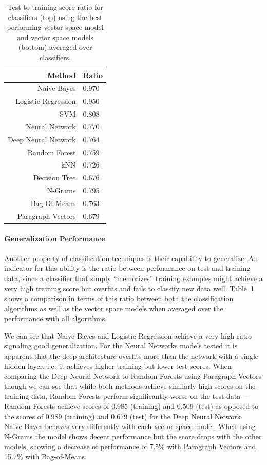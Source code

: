 \begin{table}
  \centering
\begin{tabular}{ r l }
  \toprule
  Method & Ratio \\
  \midrule
  Naive Bayes & 0.970 \\
  Logistic Regression & 0.950 \\
  SVM & 0.808 \\
  Neural Network & 0.770 \\
  Deep Neural Network & 0.764 \\
  Random Forest & 0.759 \\
  kNN & 0.726 \\
  Decision Tree & 0.676 \\
  \midrule
  N-Grams & 0.795 \\
  Bag-Of-Means & 0.763 \\
  Paragraph Vectors & 0.679 \\
  \bottomrule
\end{tabular}
\caption{Test to training score ratio for classifiers (top) using the best performing vector space model and vector space models (bottom) averaged over classifiers.}
\label{tab:Test/Training Ratio}
\end{table}

\paragraph{Generalization Performance}
\label{par:Generalization Performance}

Another property of classification techniques is their capability to generalize. An indicator for this ability is the ratio between performance on test and training data, since a classifier that simply ``memorizes'' training examples might achieve a very high training score but overfits and fails to classify new data well. Table~\ref{tab:Test/Training Ratio} shows a comparison in terms of this ratio between both the classification algorithms as well as the vector space models when averaged over the performance with all algorithms.

We can see that Naive Bayes and Logistic Regression achieve a very high ratio signaling good generalization.
For the Neural Networks models tested it is apparent that the deep architecture overfits more than the network with a single hidden layer, i.e.\ it achieves higher training but lower test scores. When comparing the Deep Neural Network to Random Forests using Paragraph Vectors though we can see that while both methods achieve similarly high scores on the training data, Random Forests perform significantly worse on the test data --- Random Forests achieve scores of 0.985 (training) and 0.509 (test) as opposed to the scores of 0.989 (training) and 0.679 (test) for the Deep Neural Network.
Naive Bayes behaves very differently with each vector space model. When using N-Grams the model shows decent performance but the score drops with the other models, showing a decrease of performance of 7.5\% with Paragraph Vectors and 15.7\% with Bag-of-Means.

